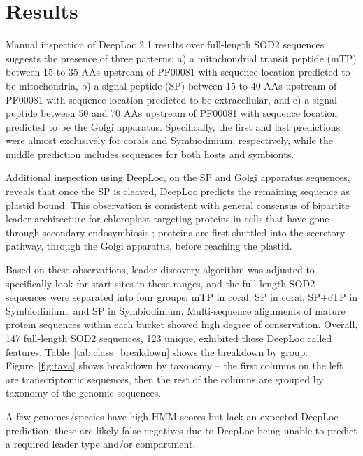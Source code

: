 
\section*{Results}

Manual inspection of DeepLoc 2.1 results over full-length SOD2 sequences
suggests the presence of three patterns: a) a mitochondrial transit peptide
(mTP) between 15 to 35 AAs upstream of PF00081 with sequence location predicted
to be mitochondria, b) a signal peptide (SP) between 15 to 40 AAs upstream of
PF00081 with sequence location predicted to be extracellular, and c) a signal
peptide between 50 and 70 AAs upstream of PF00081 with sequence location
predicted to be the Golgi apparatus. Specifically, the first and last
predictions were almost exclusively for corals and Symbiodinium, respectively,
while the middle prediction includes sequences for both hosts and symbionts.

Additional inspection using DeepLoc, on the SP and Golgi apparatus sequences,
reveals that once the SP is cleaved, DeepLoc predicts the remaining sequence as
plastid bound. This observation is consistent with general consensus of
bipartite leader architecture for chloroplast-targeting proteins in cells that
have gone through secondary endosymbiosis \cite{mcfadden1999plantbio}; proteins
are first shuttled into the secretory pathway, through the Golgi apparatus,
before reaching the plastid.

Based on these observations, leader discovery algorithm was adjusted to
specifically look for start sites in these ranges, and the full-length SOD2
sequences were separated into four groups: mTP in coral, SP in coral,
SP+cTP in Symbiodinium, and SP in Symbiodinium. Multi-sequence alignments of
mature protein sequences within each bucket showed high degree of conservation.
Overall, 147 full-length SOD2 sequences, 123 unique, exhibited these DeepLoc
called features. Table~\ref{tab:class_breakdown} shows the breakdown by group.
Figure~\ref{fig:taxa} shows breakdown by taxonomy -- the first columns on the
left are transcriptomic sequences, then the rest of the columns are grouped by
taxonomy of the genomic sequences.

A few genomes/species have high HMM scores but lack an expected DeepLoc
prediction; these are likely false negatives due to DeepLoc being unable to
predict a required leader type and/or compartment.

